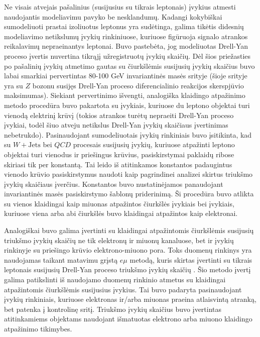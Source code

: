\documentclass[a4paper, 12pt, oneside]{article}
\newcommand{\emu}{e\mu}
\newcommand{\WJets}{W\! +\!\mathrm{Jets}}
\newcommand{\QCD}{QC\! D}
\begin{document}
Ne visais atvejais pašalinius (susijusius su tikrais leptonais) įvykius atmesti naudojantis modeliavimu pavyko be nesklandumų.
Kadangi kokybiškai sumodeliuoti prastai izoliuotus leptonus yra sudėtinga, galima tikėtis didesnių modeliavimo netikslumų
įvykių rinkiniuose, kuriuose figūruoja signalo atrankos reikalavimų nepraeinantys leptonai.
Buvo pastebėta, jog modeliuotas Drell-Yan proceso įvertis nuvertina tikrąjį užregistruotų įvykių skaičių.
Dėl šios priežasties po pašalinių įvykių atmetimo gautas su čiurkšlėmis susijusių įvykių skaičius buvo labai smarkiai
pervertintas 80-100 GeV invariantinės masės srityje (šioje srityje yra su $Z$ bozonu susijęs Drell-Yan proceso diferencialinio
reakcijos skerspjūvio maksimumas).
Siekiant pervertinimo išvengti, analogiška klaidingo atpažinimo metodo procedūra buvo pakartota su įvykiais, kuriuose du
leptono objektai turi vienodą elektrinį krūvį (tokios atrankos turėtų nepraeiti Drell-Yan proceso įvykiai, todėl šiuo atveju
netikslus Drell-Yan įvykių skaičiaus įvertinimas nebetrukdo).
Pasinaudojant sumodeliuotais įvykių rinkiniais buvo įsitikinta, kad su $\WJets$ bei $\QCD$ procesais susijusių įvykių, kuriuose
atpažinti leptono objektai turi vienodus ir priešingus krūvius, pasiskirstymai paklaidų ribose skiriasi tik per konstantą.
Tai leido iš atitinkamos konstantos padaugintus vienodo krūvio pasiskirstymus naudoti kaip pagrindinei analizei skirtus
triukšmo įvykių skaičiaus įverčius.
Konstantos buvo nustatinėjamos panaudojant invariantinės masės pasiskirstymo šablonų priderinimą.
Ši procedūra buvo atlikta su vienos klaidingai kaip miuonas atpažintos čiurkšlės įvykiais bei įvykiais, kuriuose viena arba abi
čiurkšlės buvo klaidingai atpažintos kaip elektronai.

Analogiškai buvo galima įvertinti su klaidingai atpažintomis čiurkšlėmis susijusių triukšmo įvykių skaičių ne tik elektronų
ir miuonų kanaluose, bet ir įvykių rinkinyje su priešingo krūvio elektrono-miuono pora.
Toks duomenų rinkinys yra naudojamas taikant matavimu grįstą $\emu$ metodą, kuris skirtas įvertinti su tikrais leptonais susijusių
Drell-Yan proceso triukšmo įvykių skaičių \cite{MAbak}.
Šio metodo įvertį galima patikslinti iš naudojamo duomenų rinkinio atmetus su klaidingai atpažintomis čiurkšlėmis susijusius
įvykius.
Tai buvo padaryta pasinaudojant įvykių rinkiniais, kuriuose elektronas ir/arba miuonas praeina atlaisvintą atranką, bet patenka
į kontrolinę sritį.
Triukšmo įvykių skaičius buvo įvertintas atitinkamiems objektams naudojant išmatuotas elektrono arba miuono klaidingo atpažinimo
tikimybes.
\end{document}
